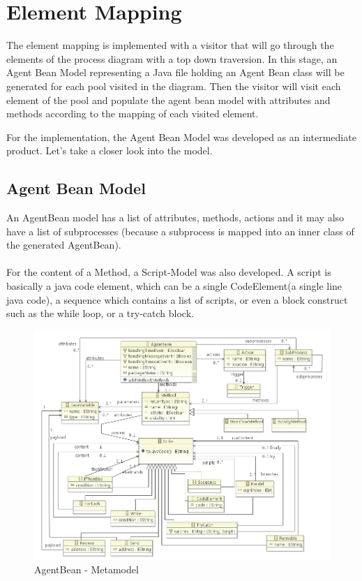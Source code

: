 \section{Element Mapping}
The element mapping is implemented with a visitor that will go through the elements of the process diagram with a top down traversion. In this stage, an Agent Bean Model representing a Java file holding an Agent Bean class will be generated for each pool visited in the diagram. Then the visitor will visit each element of the pool and  populate the agent bean model with attributes and methods according to the mapping of each visited element. 

For the implementation, the Agent Bean Model was developed as an intermediate product. Let's take a closer look into the model. 
\subsection{Agent Bean Model}

An AgentBean model has a list of attributes, methods, actions and it may also have a list of subprocesses (because a subprocess is mapped into an inner class of the generated AgentBean).\\\\
For the content of a Method, a Script-Model was also developed. A script is basically a java code element, which can be a single CodeElement(a single line java code), a sequence which contains a list of scripts, or even a block construct such as the while loop, or a try-catch block. 

\begin{figure}[h]
	\centering\includegraphics[width=1.0\textwidth]{images/agentBean_metamodel.png}
	\caption{AgentBean - Metamodel}
	\label{fig:agentbean_metamodel}
\end{figure}

